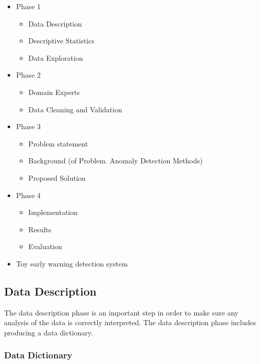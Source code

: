 \documentclass[11pt]{article}
\providecommand{\tightlist}{%
      \setlength{\itemsep}{0pt}\setlength{\parskip}{0pt}}
\begin{document}
\begin{itemize}
\tightlist
\item
  Phase 1

  \begin{itemize}
  \tightlist
  \item
    Data Description
  \item
    Descriptive Statistics
  \item
    Data Exploration
  \end{itemize}
\item
  Phase 2

  \begin{itemize}
  \tightlist
  \item
    Domain Experts
  \item
    Data Cleaning and Validation
  \end{itemize}
\item
  Phase 3

  \begin{itemize}
  \tightlist
  \item
    Problem statement
  \item
    Background (of Problem. Anomaly Detection Methods)
  \item
    Proposed Solution
  \end{itemize}
\item
  Phase 4

  \begin{itemize}
  \tightlist
  \item
    Implementation
  \item
    Results
  \item
    Evaluation
  \end{itemize}
\item
  Toy early warning detection system
\end{itemize}

    \subsection{Data Description}\label{data-description}

The data description phase is an important step in order to make sure
any analysis of the data is correctly interpreted. The data description
phase includes producing a data dictionary.

\subsubsection{Data Dictionary}\label{data-dictionary}
\end{document}
